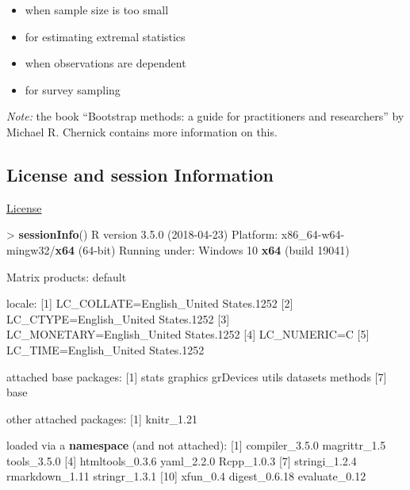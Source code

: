 \documentclass[]{article}
\newenvironment{Shaded}{\begin{snugshade}}{\end{snugshade}}
\newcommand{\KeywordTok}[1]{\textcolor[rgb]{0.13,0.29,0.53}{\textbf{{#1}}}}
\newcommand{\DecValTok}[1]{\textcolor[rgb]{0.00,0.00,0.81}{{#1}}}
\newcommand{\FloatTok}[1]{\textcolor[rgb]{0.00,0.00,0.81}{{#1}}}
\newcommand{\StringTok}[1]{\textcolor[rgb]{0.31,0.60,0.02}{{#1}}}
\newcommand{\NormalTok}[1]{{#1}}
\providecommand{\tightlist}{%
  \setlength{\itemsep}{0pt}\setlength{\parskip}{0pt}}
\begin{document}
\begin{itemize}
\tightlist
\item
  when sample size is too small
\item
  for estimating extremal statistics
\item
  when observations are dependent
\item
  for survey sampling
\end{itemize}

\emph{Note:} the book ``Bootstrap methods: a guide for practitioners and
researchers'' by Michael R. Chernick contains more information on this.

\subsection{License and session
Information}\label{license-and-session-information}

\href{http://math.wsu.edu/faculty/xchen/stat412/LICENSE.html}{License}

\begin{Shaded}
\begin{Highlighting}[]
\NormalTok{>}\StringTok{ }\KeywordTok{sessionInfo}\NormalTok{()}
\NormalTok{R version }\FloatTok{3.5.0} \NormalTok{(}\DecValTok{2018-04-23}\NormalTok{)}
\NormalTok{Platform:}\StringTok{ }\NormalTok{x86_64-w64-mingw32/}\KeywordTok{x64} \NormalTok{(}\DecValTok{64}\NormalTok{-bit)}
\NormalTok{Running under:}\StringTok{ }\NormalTok{Windows }\DecValTok{10} \KeywordTok{x64} \NormalTok{(build }\DecValTok{19041}\NormalTok{)}

\NormalTok{Matrix products:}\StringTok{ }\NormalTok{default}

\NormalTok{locale:}
\NormalTok{[}\DecValTok{1}\NormalTok{] LC_COLLATE=English_United States}\FloatTok{.1252} 
\NormalTok{[}\DecValTok{2}\NormalTok{] LC_CTYPE=English_United States}\FloatTok{.1252}   
\NormalTok{[}\DecValTok{3}\NormalTok{] LC_MONETARY=English_United States}\FloatTok{.1252}
\NormalTok{[}\DecValTok{4}\NormalTok{] LC_NUMERIC=C                          }
\NormalTok{[}\DecValTok{5}\NormalTok{] LC_TIME=English_United States}\FloatTok{.1252}    

\NormalTok{attached base packages:}
\NormalTok{[}\DecValTok{1}\NormalTok{] stats     graphics  grDevices utils     datasets  methods  }
\NormalTok{[}\DecValTok{7}\NormalTok{] base     }

\NormalTok{other attached packages:}
\NormalTok{[}\DecValTok{1}\NormalTok{] knitr_1}\FloatTok{.21}

\NormalTok{loaded via a }\KeywordTok{namespace} \NormalTok{(and not attached):}
\StringTok{ }\NormalTok{[}\DecValTok{1}\NormalTok{] compiler_3}\FloatTok{.5.0}  \NormalTok{magrittr_1}\FloatTok{.5}    \NormalTok{tools_3}\FloatTok{.5.0}    
 \NormalTok{[}\DecValTok{4}\NormalTok{] htmltools_0}\FloatTok{.3.6} \NormalTok{yaml_2}\FloatTok{.2.0}      \NormalTok{Rcpp_1}\FloatTok{.0.3}     
 \NormalTok{[}\DecValTok{7}\NormalTok{] stringi_1}\FloatTok{.2.4}   \NormalTok{rmarkdown_1}\FloatTok{.11}  \NormalTok{stringr_1}\FloatTok{.3.1}  
\NormalTok{[}\DecValTok{10}\NormalTok{] xfun_0}\FloatTok{.4}        \NormalTok{digest_0}\FloatTok{.6.18}   \NormalTok{evaluate_0}\FloatTok{.12}  
\end{Highlighting}
\end{Shaded}
\end{document}

